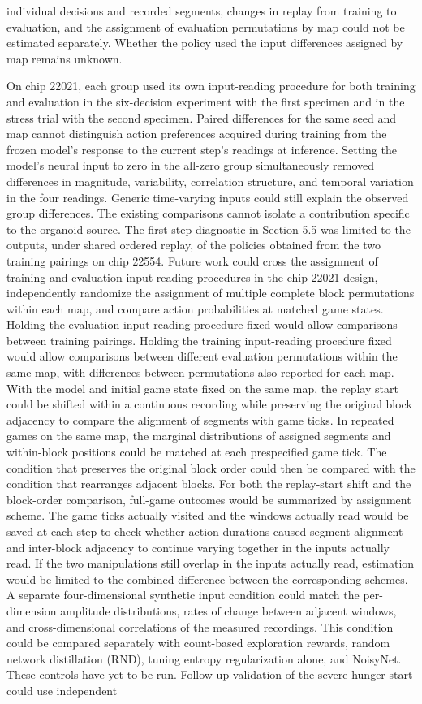 \documentclass{article}
\begin{document}
individual decisions and recorded segments, changes in replay from training to evaluation, and the assignment of evaluation permutations by map could not be estimated separately. Whether the policy used the input differences assigned by map remains unknown.


On chip 22021, each group used its own input-reading procedure for both training and evaluation in the six-decision experiment with the first specimen and in the stress trial with the second specimen. Paired differences for the same seed and map cannot distinguish action preferences acquired during training from the frozen model's response to the current step's readings at inference. Setting the model's neural input to zero in the all-zero group simultaneously removed differences in magnitude, variability, correlation structure, and temporal variation in the four readings. Generic time-varying inputs could still explain the observed group differences. The existing comparisons cannot isolate a contribution specific to the organoid source. The first-step diagnostic in Section 5.5 was limited to the outputs, under shared ordered replay, of the policies obtained from the two training pairings on chip 22554. Future work could cross the assignment of training and evaluation input-reading procedures in the chip 22021 design, independently randomize the assignment of multiple complete block permutations within each map, and compare action probabilities at matched game states. Holding the evaluation input-reading procedure fixed would allow comparisons between training pairings. Holding the training input-reading procedure fixed would allow comparisons between different evaluation permutations within the same map, with differences between permutations also reported for each map. With the model and initial game state fixed on the same map, the replay start could be shifted within a continuous recording while preserving the original block adjacency to compare the alignment of segments with game ticks. In repeated games on the same map, the marginal distributions of assigned segments and within-block positions could be matched at each prespecified game tick. The condition that preserves the original block order could then be compared with the condition that rearranges adjacent blocks. For both the replay-start shift and the block-order comparison, full-game outcomes would be summarized by assignment scheme. The game ticks actually visited and the windows actually read would be saved at each step to check whether action durations caused segment alignment and inter-block adjacency to continue varying together in the inputs actually read. If the two manipulations still overlap in the inputs actually read, estimation would be limited to the combined difference between the corresponding schemes. A separate four-dimensional synthetic input condition could match the per-dimension amplitude distributions, rates of change between adjacent windows, and cross-dimensional correlations of the measured recordings. This condition could be compared separately with count-based exploration rewards, random network distillation (RND), tuning entropy regularization alone, and NoisyNet. These controls have yet to be run. Follow-up validation of the severe-hunger start could use independent 
\end{document}

